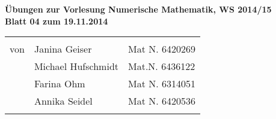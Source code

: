 \documentclass[11pt]{article}
\begin{document}
\begin{center}
\textbf{
Übungen zur Vorlesung Numerische Mathematik, WS 2014/15\\
Blatt 04 zum 19.11.2014\\
}

\begin{tabular}{lll}
& \\
von & Janina Geiser & Mat N. 6420269\\
& Michael Hufschmidt & Mat.N. 6436122\\
& Farina Ohm & Mat N. 6314051\\
& Annika Seidel & Mat N. 6420536\\
\\
\hline
\end{tabular}
\end{center}






\end{document}

